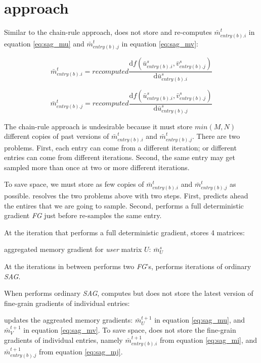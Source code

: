 \section{approach}
Similar to the chain-rule approach, \tool does not store and re-computes $\bar{m}_{entry(b).i}^{t}$ in equation \ref{eq:sag_mu} and $\bar{m}_{entry(b).j}^{t}$ in equation \ref{eq:sag_mv}:

\begin{equation} \label{eq:sagre_mi}
  \bar{m}_{entry(b).i}^{t} = recomputed  \frac{\text{d}f(\bar{u}_{entry(b).i}^{s}, \bar{v}_{entry(b).j}^{s})}{\text{d}\bar{u}_{entry(b).i}^{s}}
\end{equation}

\begin{equation} \label{eq:sagre_mj}
  \bar{m}_{entry(b).j}^{t} = recomputed  \frac{\text{d}f(\bar{u}_{entry(b).i}^{s}, \bar{v}_{entry(b).j}^{s})}{\text{d}\bar{u}_{entry(b).j}^{s}}
\end{equation}

The chain-rule approach is undesirable because it must store $min(M,N)$ different copies of past versions of $\bar{m}_{entry(b).i}^{t}$ and $\bar{m}_{entry(b).j}^{t}$.
There are two problems.  First, each entry can come from a different iteration; or different entries can come from different iterations.
Second, the same entry may get sampled more than once at two or more different iterations.

To save space, we must store as few copies of $\bar{m}_{entry(b).i}^{t}$ and $\bar{m}_{entry(b).j}^{t}$ as possible.
\tool resolves the two problems above with two steps.
First, \tool predicts ahead the entires that we are going to sample.
Second, \tool performs a full deterministic gradient \emph{FG} just before \tool re-samples the same entry.

At the iteration that \tool performs a full deterministic gradient, \tool stores 4 matrices:
\begin{compactitem}
\item aggregated memory gradient for \emph{user} matrix $U$: $\bar{m}_{U}^{s}$
\end{compactitem}

At the iterations in between \tool performs two \emph{FG}'s, \tool performs iterations of ordinary \emph{SAG}.

When \tool performs ordinary \emph{SAG}, \tool computes but does not store the latest version of fine-grain gradients of individual entries: 


\tool updates the aggreated memory gradients: $\bar{m}_{U}^{t+1}$ in equation \ref{eq:sag_mu}, and $\bar{m}_{V}^{t+1}$ in equation \ref{eq:sag_mv}.
To save space, \tool does not store the fine-grain gradients of individual entries, 
namely $\bar{m}_{entry(b).i}^{t+1}$ from equation \ref{eq:sag_mi}, and $\bar{m}_{entry(b).j}^{t+1}$ from equation \ref{eq:sag_mj}.


